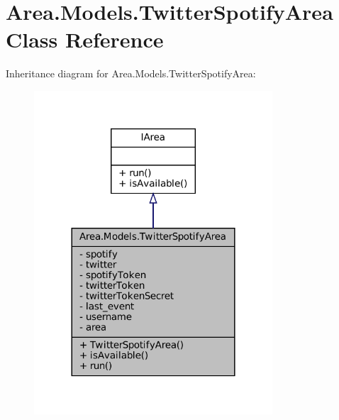\hypertarget{classArea_1_1Models_1_1TwitterSpotifyArea}{}\section{Area.\+Models.\+Twitter\+Spotify\+Area Class Reference}
\label{classArea_1_1Models_1_1TwitterSpotifyArea}


Inheritance diagram for Area.\+Models.\+Twitter\+Spotify\+Area\+:
\nopagebreak
\begin{figure}[H]
\begin{center}
\leavevmode
\includegraphics[width=252pt]{classArea_1_1Models_1_1TwitterSpotifyArea__inherit__graph}
\end{center}
\end{figure}


